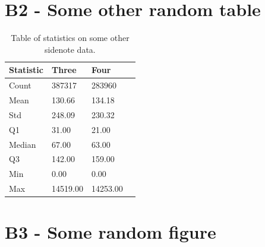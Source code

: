 \newpage
\section*{\large{B2 - Some other random table}}
\vspace*{1cm}

\begin{table}[ht!]
\centering
    \begin{tabular}{ m{4cm} m{2.5cm} m{2.5cm} m{2.5cm} } 
    \toprule
    \toprule
    \textbf{Statistic} & \textbf{Three} & \textbf{Four}  \\
    \midrule
    Count   & 387317    & 283960    \\[1.3ex]
    Mean    & 130.66    & 134.18    \\[1.3ex]
    Std     & 248.09    & 230.32    \\[1.3ex]
    Q1      & 31.00     & 21.00     \\[1.3ex]
    Median  & 67.00     & 63.00     \\[1.3ex]
    Q3      & 142.00    & 159.00    \\[1.3ex]
    Min     & 0.00      & 0.00      \\[1.3ex]
    Max     & 14519.00  & 14253.00  \\[1.3ex]
    \bottomrule
    \bottomrule
    \end{tabular}
\caption[Statistics on something else]{Table of statistics on some other sidenote data.}
\end{table}



\newpage
\section*{\large{B3 - Some random figure}}
\vspace*{1cm}

